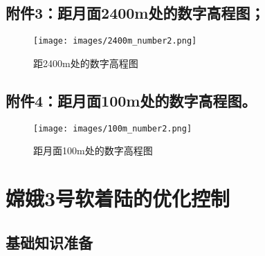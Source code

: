     \subsection{附件3：距月面2400m处的数字高程图；}
            \begin{figure}[H]
            \centering
            \texttt{[image: images/2400m\_number2.png]}
            \caption{距2400m处的数字高程图}
            \label{fig:距2400m处的数字高程图}
            \end{figure}
    \subsection{附件4：距月面100m处的数字高程图。}
            \begin{figure}[H]
            \centering
            \texttt{[image: images/100m\_number2.png]}
            \caption{距月面100m处的数字高程图}
            \label{fig:距月面100m处的数字高程图}
            \end{figure}
\section{嫦娥3号软着陆的优化控制}
    \subsection{基础知识准备}
